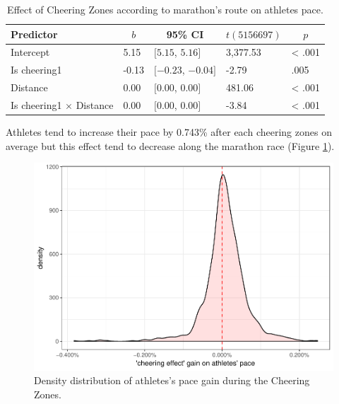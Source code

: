 \documentclass[,man]{apa6}
\theoremstyle{definition}
\theoremstyle{definition}
\theoremstyle{definition}
\theoremstyle{remark}
\begin{document}
\begin{table}[tbp]
\begin{center}
\begin{threeparttable}
\caption{\label{tab:table_ischeering}Effect of Cheering Zones according to marathon's route on athletes pace.}
\begin{tabular}{lllll}
\toprule
Predictor & \multicolumn{1}{c}{$b$} & \multicolumn{1}{c}{95\% CI} & \multicolumn{1}{c}{$t(5156697)$} & \multicolumn{1}{c}{$p$}\\
\midrule
Intercept & 5.15 & $[5.15$, $5.16]$ & 3,377.53 & < .001\\
Is cheering1 & -0.13 & $[-0.23$, $-0.04]$ & -2.79 & .005\\
Distance & 0.00 & $[0.00$, $0.00]$ & 481.06 & < .001\\
Is cheering1 $\times$ Distance & 0.00 & $[0.00$, $0.00]$ & -3.84 & < .001\\
\bottomrule
\end{tabular}
\end{threeparttable}
\end{center}
\end{table}

Athletes tend to increase their pace by 0.743\% after each cheering
zones on average but this effect tend to decrease along the marathon
race (Figure \ref{fig:plot-pace-gain}).

\begin{figure}

{\centering \includegraphics{marathon_cheering_effect_files/figure-latex/plot-pace-gain-1} 

}

\caption{Density distribution of athletes's pace gain during the Cheering Zones.}\label{fig:plot-pace-gain}
\end{figure}
\end{document}
